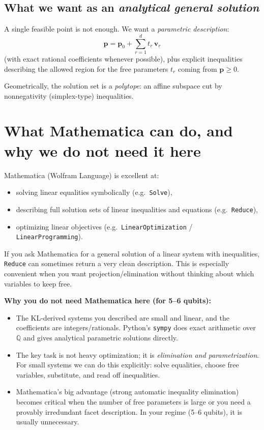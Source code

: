 \documentclass[11pt]{article}
\begin{document}
\subsection*{What we want as an \emph{analytical general solution}}
A single feasible point is not enough. We want a \emph{parametric description}:
\[
\mathbf{p} = \mathbf{p}_0 + \sum_{r=1}^d t_r\, \mathbf{v}_r
\]
(with exact rational coefficients whenever possible), plus explicit inequalities describing the allowed region for the free parameters $t_r$ coming from $\mathbf{p}\ge 0$.

Geometrically, the solution set is a \emph{polytope}: an affine subspace cut by nonnegativity (simplex-type) inequalities.

\section{What Mathematica can do, and why we do not need it here}

Mathematica (Wolfram Language) is excellent at:
\begin{itemize}
  \item solving linear equalities symbolically (e.g.\ \texttt{Solve}),
  \item describing full solution sets of linear inequalities and equations (e.g.\ \texttt{Reduce}),
  \item optimizing linear objectives (e.g.\ \texttt{LinearOptimization} / \texttt{LinearProgramming}).
\end{itemize}

If you ask Mathematica for a general solution of a linear system with inequalities, \texttt{Reduce} can sometimes return a very clean description. This is especially convenient when you want projection/elimination without thinking about which variables to keep free.

\medskip
\noindent
\textbf{Why you do not need Mathematica here (for 5--6 qubits):}

\begin{itemize}
  \item The KL-derived systems you described are small and linear, and the coefficients are integers/rationals. Python's \texttt{sympy} does exact arithmetic over $\mathbb{Q}$ and gives analytical parametric solutions directly.
  \item The key task is not heavy optimization; it is \emph{elimination and parametrization}. For small systems we can do this explicitly: solve equalities, choose free variables, substitute, and read off inequalities.
  \item Mathematica's big advantage (strong automatic inequality elimination) becomes critical when the number of free parameters is large or you need a provably irredundant facet description. In your regime (5--6 qubits), it is usually unnecessary.
\end{itemize}
\end{document}

